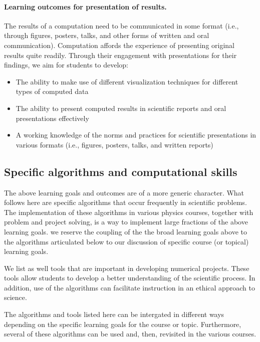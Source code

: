 \noindent
\paragraph{Learning outcomes for presentation of results.}
The results of a computation need to be communicated in some format (i.e., through figures, posters, talks, and other forms of written and oral communication). Computation affords the experience of presenting original results quite readily. Through their engagement with presentations for their findings, we aim for students to develop:

\begin{itemize}
\item The ability to make use of different visualization techniques for different types of computed data

\item The ability to present computed results in scientific reports and oral presentations effectively

\item A working knowledge of the norms and practices for scientific presentations in various formats (i.e., figures, posters, talks, and written reports)
\end{itemize}

\noindent
\subsection*{Specific algorithms and computational skills}

The above learning goals and outcomes are of a more generic character. What follows here are specific
algorithms that occur frequently in scientific problems. The implementation of these algorithms in various physics courses, together with problem and project solving, is a way to implement large fractions of the above learning goals. we reserve the coupling of the the broad learning goals above to the algorithms articulated below to our discussion of specific course (or topical) learning goals.

We list as well tools that are important in developing
numerical projects. These tools allow students to develop a better understanding of the scientific process. In addition, use of the algorithms can facilitate instruction in an ethical approach to science.

The algorithms and tools listed here can be intergated in different ways depending on the specific learning goals for the course or topic. Furthermore, several of these algorithms can be used and, then, revisited in the various courses.

